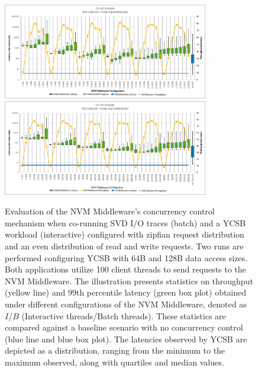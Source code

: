 \begin{figure}
  \centering
  \includegraphics[width=0.8\textwidth,height=\textheight,keepaspectratio,angle=0]{images/64b_50_50_middleware_eval.png}
  \includegraphics[width=0.8\textwidth,height=\textheight,keepaspectratio,angle=0]{images/128b_50_50_middleware_eval.png}
  \caption[Evaluation of NVM Middleware: Benchmark A]{Evaluation of the NVM Middleware's concurrency control mechanism when co-running SVD I/O traces (batch) and a YCSB workload (interactive) configured with zipfian request distribution and an even distribution of read and write requests. Two runs are performed configuring YCSB with 64B and 128B data access sizes. Both applications utilize 100 client threads to send requests to the NVM Middleware. The illustration presents statistics on throughput (yellow line) and 99th percentile latency (green box plot) obtained under different configurations of the NVM Middleware, denoted as $I/B$ (Interactive threads/Batch threads). These statistics are compared against a baseline scenario with no concurrency control (blue line and blue box plot). The latencies observed by YCSB are depicted as a distribution, ranging from the minimum to the maximum observed, along with quartiles and median values.}
  \label{fig:50_50_middleware_eval}
\end{figure}

